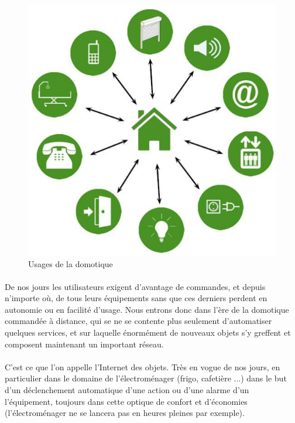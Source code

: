         \begin{figure}[h]
            \begin{center}
                \includegraphics[scale=0.4]{./images/cpl/partieDomotique.png}
            \end{center}
                \caption{ Usages de la domotique }
                \label{Usages de la domotique}
        \end{figure}

        \paragraph{}
De nos jours les utilisateurs exigent d'avantage de commandes, et depuis n'importe où,
de tous leurs équipements sans que ces derniers perdent en autonomie ou en facilité d'usage.
Nous entrons donc dans l’ère de la domotique commandée à distance, qui se ne se contente plus seulement d'automatiser quelques services,
et sur laquelle énormément de nouveaux objets s'y greffent et composent maintenant un important réseau.
        \paragraph{}
C’est ce que l’on appelle l’Internet des objets.
Très en vogue de nos jours, en particulier dans le domaine de l’électroménager (frigo, cafetière ...)
dans le but d'un déclenchement automatique d'une action ou d'une alarme d'un l'équipement,
toujours dans cette optique de confort et d'économies (l'électroménager ne se lancera pas en heures pleines par exemple).

